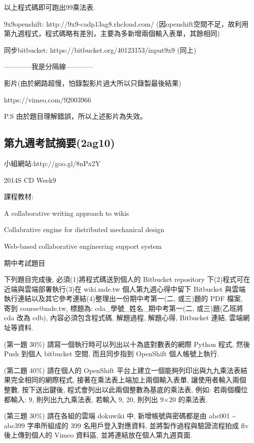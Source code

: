 \documentclass[]{article}
\begin{document}
以上程式碼即可跑出99乘法表.

9x9openshift: http://9x9-cadp13ag8.rhcloud.com/
(因openshift空間不足，故利用第九週程式，程式碼略有差別，主要為多新增兩個輸入表單，其餘相同)

同步bitbucket: https://bitbucket.org/40123153/input9x9 (同上)

------------我是分隔線------------

影片(由於網路超慢，怕錄製影片過大所以只錄製最後結果)

https://vimeo.com/92003966

P.S 由於題目理解錯誤，所以上述影片為失效。

\subsection{第九週考試摘要(2ag10)}\label{ux7b2cux4e5dux9031ux8003ux8a66ux6458ux89812ag10}

小組網站:http://goo.gl/8nPx2Y

2014S CD Week9

課程教材:

A collaborative writing approach to wikis

Collabrative engine for distributed mechanical design

Web-based collaborative engineering support system

期中考試題目

下列題目完成後, 必須(1)將程式碼送到個人的 Bitbucket repository
下(2)程式可在近端與雲端部署執行(3)在 wiki.mde.tw 個人第九週心得中留下
Bitbucket 與雲端執行連結以及其它參考連結(4)整理出一份期中考第一(二,
或三)題的 PDF 檔案, 寄到 course@mde.tw, 標題為:
cda\_學號\_姓名\_期中考第一(二, 或三)題(乙班將 cda 改為 cdb),
內容必須包含程式碼, 解題過程, 解題心得, Bitbucket 連結, 雲端網址等資料.

(第一題 30\%) 請寫一個執行時可以列出以十為底對數表的網際 Python 程式,
然後 Push 到個人 bitbucket 空間, 而且同步指到 OpenShift 個人帳號上執行.

(第二題 40\%) 請在個人的 OpenShift
平台上建立一個能夠列印出與九九乘法表結果完全相同的網際程式,
接著在乘法表上端加上兩個輸入表單, 讓使用者輸入兩個整數, 按下送出鍵後,
程式會列出以此兩個整數為基底的乘法表, 例如: 若兩個欄位都輸入: 9,
則列出九九乘法表, 若輸入 9, 20, 則列出 9×20 的乘法表.

(第三題 30\%) 請在各組的雲端 dokuwiki 中, 新增帳號與密碼都是由 abc001
\textasciitilde{} abc399 字串所組成的 399 名用戶登入對應資料,
並將製作過程與驗證流程拍成 flv 後上傳到個人的 Vimeo 資料區,
並將連結放在個人第九週頁面.
\end{document}
